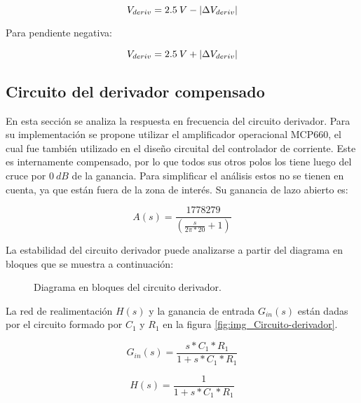 \begin{equation}\label{eq_vderiv_pos}
	V_{deriv}=2.5\:V - \lvert\Delta V_{deriv}\rvert
\end{equation} 


Para pendiente negativa:

\begin{equation}\label{eq_vderiv_neg}
	V_{deriv}=2.5\:V + \lvert\Delta V_{deriv}\rvert
\end{equation} 



\subsection{Circuito del derivador compensado}

En esta sección se analiza la respuesta en frecuencia del circuito derivador. Para su implementación se propone utilizar el amplificador operacional MCP660, el cual fue  también utilizado en el diseño circuital del controlador de corriente. Este es internamente compensado, por lo que todos sus otros polos los tiene luego del cruce por $0\:dB$ de la ganancia. Para simplificar el análisis estos no se tienen en cuenta, ya que están fuera de la zona de interés. Su ganancia de lazo abierto es:

\begin{equation} \label{eq_Aw_1}
	A(s)=\frac{1778279}{(\frac{s}{2\pi *20}+1)}
\end{equation} 

La estabilidad del circuito derivador puede analizarse a partir del diagrama en bloques que se muestra a continuación:

\begin{figure}[H]
	\centering
	
	\caption{Diagrama en bloques del circuito derivador.}	\label{fig:img_diag-en-bloques_derivador}
\end{figure}



La red de realimentación $H(s)$ y la ganancia de entrada $G_{in}(s)$ están dadas por el circuito formado por $C_1$ y $R_1$ en la figura \ref{fig:img_Circuito-derivador}.

\begin{equation}
	G_{in}(s)=\frac{s*C_1*R_1}{1+s*C_1*R_1}
\end{equation}

\begin{equation}
	H(s)=\frac{1}{1+s*C_1*R_1}
\end{equation}


